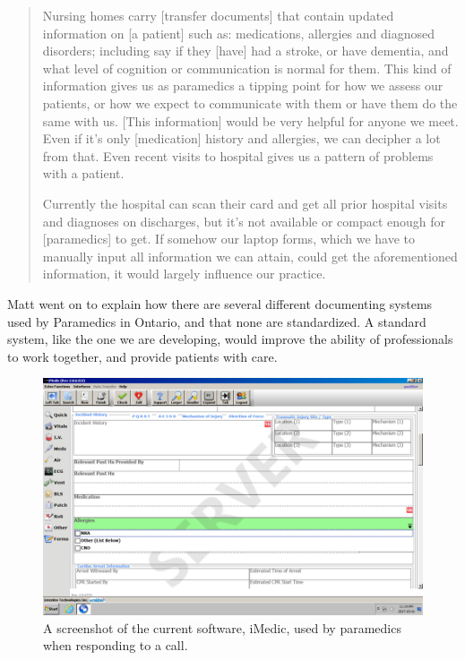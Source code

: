 \blockquote{Nursing homes carry [transfer documents] that contain updated information on [a patient] such as: medications, allergies and diagnosed disorders; including say if they [have] had a stroke, or have dementia, and what level of cognition or communication is normal for them. This kind of information gives us as paramedics a tipping point for how we assess our patients, or how we expect to communicate with them or have them do the same with us. [This information] would be very helpful for anyone we meet. Even if it's only [medication] history and allergies, we can decipher a lot from that. Even recent visits to hospital gives us a pattern of problems with a patient.

Currently the hospital can scan their card and get all prior hospital visits and diagnoses on discharges, but it's not available or compact enough for [paramedics] to get. If somehow our laptop forms, which we have to manually input all information we can attain, could get the aforementioned information, it would largely influence our practice.
}

Matt went on to explain how there are several different documenting systems used by Paramedics in Ontario, and that none are standardized. A standard system, like the one we are developing, would improve the ability of professionals to work together, and provide patients with care.

\begin{figure}[h]
  \centering
  \includegraphics[width=\linewidth]{iMedic.png}
  \captionsetup{format=hang}
  \caption[Screenshot of iMedic Software]{A screenshot of the current software, iMedic, used by paramedics when responding to a call.}
  \label{fig:iMed1}
\end{figure}

